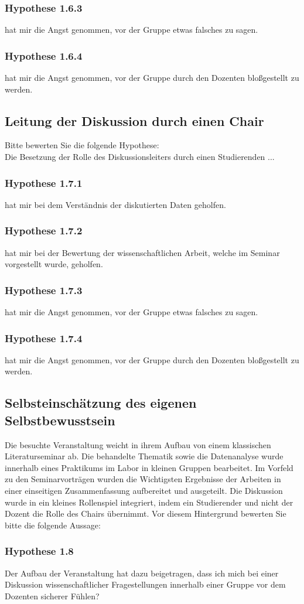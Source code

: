 \subsubsection*{Hypothese 1.6.3}
hat mir die Angst genommen, vor der Gruppe etwas falsches zu sagen.
\subsubsection*{Hypothese 1.6.4}
hat mir die Angst genommen, vor der Gruppe durch den Dozenten bloßgestellt zu werden.


\subsection*{Leitung der Diskussion durch einen Chair}
Bitte bewerten Sie die folgende Hypothese:\\
\noindent
Die Besetzung der Rolle des Diskussionsleiters durch einen Studierenden ...
\subsubsection*{Hypothese 1.7.1}
hat mir bei dem Verständnis der diskutierten Daten geholfen.
\subsubsection*{Hypothese 1.7.2}
hat mir bei der Bewertung der wissenschaftlichen Arbeit, welche im Seminar vorgestellt wurde, geholfen.
\subsubsection*{Hypothese 1.7.3}
hat mir die Angst genommen, vor der Gruppe etwas falsches zu sagen.
\subsubsection*{Hypothese 1.7.4}
hat mir die Angst genommen, vor der Gruppe durch den Dozenten bloßgestellt zu werden.

\subsection*{Selbsteinschätzung des eigenen Selbstbewusstsein}
Die besuchte Veranstaltung weicht in ihrem Aufbau von einem klassischen Literaturseminar ab. Die behandelte Thematik sowie die Datenanalyse wurde innerhalb eines Praktikums im Labor in kleinen Gruppen bearbeitet. Im Vorfeld zu den Seminarvorträgen wurden die Wichtigsten Ergebnisse der Arbeiten in einer einseitigen Zusammenfassung aufbereitet und ausgeteilt.
Die Diskussion wurde in ein kleines Rollenspiel integriert, indem ein Studierender und nicht der Dozent die Rolle des Chairs übernimmt. Vor diesem Hintergrund bewerten Sie bitte die folgende Aussage:

\subsubsection*{Hypothese 1.8}
Der Aufbau der Veranstaltung hat dazu beigetragen, dass ich mich bei einer Diskussion wissenschaftlicher Fragestellungen innerhalb einer Gruppe vor dem Dozenten sicherer Fühlen?

